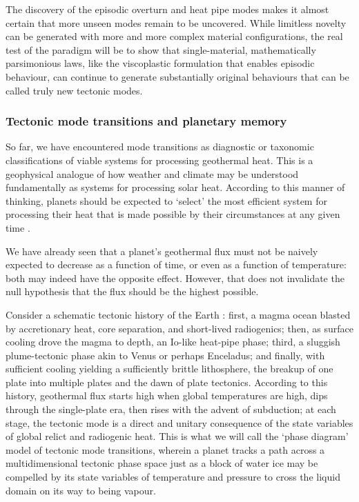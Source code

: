 \documentclass[a4paper,11pt,oneside]{book}
\begin{document}
The discovery of the episodic overturn and heat pipe modes makes it almost certain that more unseen modes remain to be uncovered. While limitless novelty can be generated with more and more complex material configurations, the real test of the paradigm will be to show that single-material, mathematically parsimonious laws, like the viscoplastic formulation that enables episodic behaviour, can continue to generate substantially original behaviours that can be called truly new tectonic modes.

\subsubsection{Tectonic mode transitions and planetary memory}

So far, we have encountered mode transitions as diagnostic or taxonomic classifications of viable systems for processing geothermal heat. This is a geophysical analogue of how weather and climate may be understood fundamentally as systems for processing solar heat. According to this manner of thinking, planets should be expected to `select' the most efficient system for processing their heat that is made possible by their circumstances at any given time \cite{Van_Thienen2005-zt}.

We have already seen that a planet's geothermal flux must not be naively expected to decrease as a function of time, or even as a function of temperature: both may indeed have the opposite effect. However, that does not invalidate the null hypothesis that the flux should be the highest possible.

Consider a schematic tectonic history of the Earth \cite{Stern2018-ow}: first, a magma ocean blasted by accretionary heat, core separation, and short-lived radiogenics; then, as surface cooling drove the magma to depth, an Io-like heat-pipe phase; third, a sluggish plume-tectonic phase akin to Venus or perhaps Enceladus; and finally, with sufficient cooling yielding a sufficiently brittle lithosphere, the breakup of one plate into multiple plates and the dawn of plate tectonics. According to this history, geothermal flux starts high when global temperatures are high, dips through the single-plate era, then rises with the advent of subduction; at each stage, the tectonic mode is a direct and unitary consequence of the state variables of global relict and radiogenic heat. This is what we will call the `phase diagram' model of tectonic mode transitions, wherein a planet tracks a path across a multidimensional tectonic phase space \citet{Sleep2000-wa, ONeill2007-yq, Sleep2007-ak} just as a block of water ice may be compelled by its state variables of temperature and pressure to cross the liquid domain on its way to being vapour.
\end{document}
